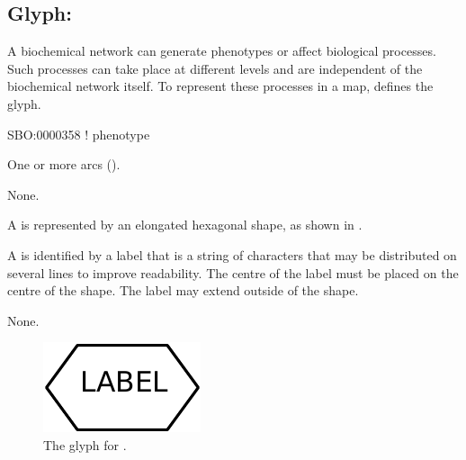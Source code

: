 \subsection{Glyph: }
\label{sec:phenotype}

A biochemical network can generate phenotypes or affect biological processes.
Such processes can take place at different levels and are independent of the biochemical network itself.
To represent these processes in a map, \PD defines the  glyph.

\begin{glyphDescription}

\glyphSboTerm
SBO:0000358 ! phenotype

\glyphIncoming
One or more  arcs ().

\glyphOutgoing
None.

\glyphContainer
A  is represented by an elongated hexagonal shape, as shown in .

\glyphLabel
A  is identified by a label that is  a string of characters that may be distributed on several lines to improve readability.
The centre of the label must be placed on the centre of the shape.
The label may extend outside of the shape.

\glyphAux 
None.

\end{glyphDescription}

\begin{figure}[H]
  \centering
  \includegraphics{images/build/phenotype.pdf}
  \caption{The \PD glyph for .}
  \label{fig:phenotype}
\end{figure}
